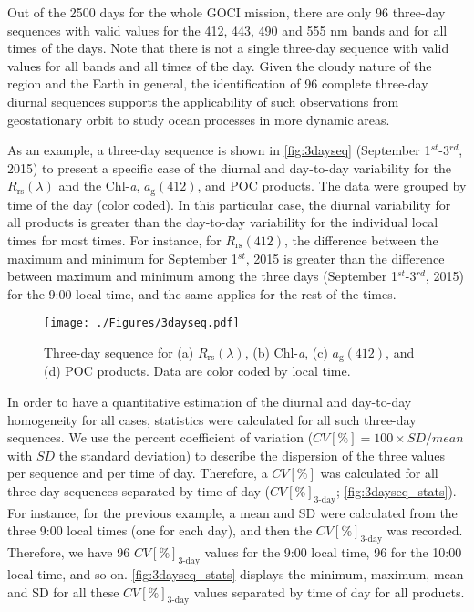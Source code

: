 \documentclass[remotesensing,article,submit,moreauthors,pdftex,10pt,a4paper]{Definitions/mdpi}
\begin{document}
Out of the 2500 days for the whole GOCI mission, there are only 96 three-day sequences with valid values for the 412, 443, 490 and 555 nm bands and for all times of the days. Note that there is not a single three-day sequence with valid values for all bands and all times of the day. Given the cloudy nature of the region and the Earth in general, the identification of 96 complete three-day diurnal sequences supports the applicability of such observations from geostationary orbit to study ocean processes in more dynamic areas. 

As an example, a three-day sequence is shown in \autoref{fig:3dayseq} (September 1$^{st}$-3$^{rd}$, 2015) to present a specific case of the diurnal and day-to-day variability for the $R_\text{rs}(\lambda)$ and the Chl-{\it a}, $a_\text{g}(412)$, and POC products. The data were grouped by time of the day (color coded). In this particular case, the diurnal variability for all products is greater than the day-to-day variability for the individual local times for most times. For instance, for $R_\text{rs}(412)$, the difference between the maximum and minimum for September 1$^{st}$, 2015 is greater than the difference between maximum and minimum among the three days (September 1$^{st}$-3$^{rd}$, 2015) for the 9:00 local time, and the same applies for the rest of the times. 

\begin{figure}[htbp!]

\centering
\texttt{[image: ./Figures/3dayseq.pdf]}
\caption{Three-day sequence for (a) $R_\text{rs}(\lambda)$, (b) Chl-{\it a}, (c) $a_\text{g}(412)$, and (d) POC products. Data are color coded by local time.\label{fig:3dayseq} }     

\end{figure}
In order to have a quantitative estimation of the diurnal and day-to-day homogeneity for all cases, statistics were calculated for all such three-day sequences. We use the percent coefficient of variation ($CV[\%] = 100 \times SD/mean$ with $SD$ the standard deviation) to describe the dispersion of the three values per sequence and per time of day. Therefore, a $CV[\%]$ was calculated for all three-day sequences separated by time of day ($CV[\%]_\text{3-day}$; \autoref{fig:3dayseq_stats}). For instance, for the previous example, a mean and SD were calculated from the three 9:00 local times (one for each day), and then the $CV[\%]_\text{3-day}$ was recorded. Therefore, we have 96 $CV[\%]_\text{3-day}$ values for the 9:00 local time, 96 for the 10:00 local time, and so on. \autoref{fig:3dayseq_stats} displays the minimum, maximum, mean and SD for all these $CV[\%]_\text{3-day}$ values separated by time of day for all products. 
\end{document}

